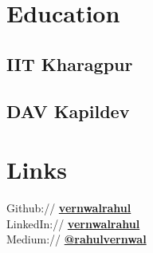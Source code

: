 \documentclass[]{deedy-resume-openfont}
\begin{document}
%
%
\lastupdated

%
%

%
%

\begin{minipage}[t]{0.33\textwidth} 


\section{Education} 

\subsection{IIT Kharagpur}
\sectionsep

\subsection{DAV Kapildev}
\sectionsep


\section{Links} 
Github:// \href{https://github.com/vernwalrahul}{\bf vernwalrahul} \\
LinkedIn://  \href{https://www.linkedin.com/in/vernwalrahul}{\bf vernwalrahul} \\
Medium://  \href{https://medium.com/rahulvernwal}{\bf @rahulvernwal} \\



\end{minipage}
\end{document}
